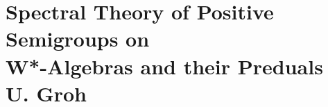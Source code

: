
\chapter{Spectral Theory of Positive Semigroups on \\ W*-Algebras and their Preduals \\
U. Groh}\label{chap:D-III}

%
%
%
%
%
%
